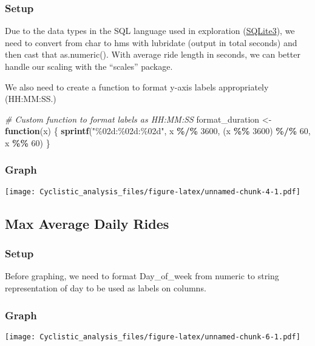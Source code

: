 \documentclass[
]{article}
\newenvironment{Shaded}{\begin{snugshade}}{\end{snugshade}}
\newcommand{\CommentTok}[1]{\textcolor[rgb]{0.56,0.35,0.01}{\textit{#1}}}
\newcommand{\ControlFlowTok}[1]{\textcolor[rgb]{0.13,0.29,0.53}{\textbf{#1}}}
\newcommand{\DecValTok}[1]{\textcolor[rgb]{0.00,0.00,0.81}{#1}}
\newcommand{\FunctionTok}[1]{\textcolor[rgb]{0.13,0.29,0.53}{\textbf{#1}}}
\newcommand{\NormalTok}[1]{#1}
\newcommand{\OtherTok}[1]{\textcolor[rgb]{0.56,0.35,0.01}{#1}}
\newcommand{\SpecialCharTok}[1]{\textcolor[rgb]{0.81,0.36,0.00}{\textbf{#1}}}
\newcommand{\StringTok}[1]{\textcolor[rgb]{0.31,0.60,0.02}{#1}}
\begin{document}
\subsubsection{Setup}\label{setup}

Due to the data types in the SQL language used in exploration
(\href{https://www.sqlite.org/datatype3.html}{SQLite3}), we need to
convert from char to hms with lubridate (output in total seconds) and
then cast that as.numeric(). With average ride length in seconds, we can
better handle our scaling with the ``scales'' package.

\begin{Shaded}
\end{Shaded}

We also need to create a function to format y-axis labels appropriately
(HH:MM:SS.)

\begin{Shaded}
\begin{Highlighting}[]
\CommentTok{\# Custom function to format labels as HH:MM:SS}
\NormalTok{format\_duration }\OtherTok{\textless{}{-}} \ControlFlowTok{function}\NormalTok{(x) \{}
  \FunctionTok{sprintf}\NormalTok{(}\StringTok{"\%02d:\%02d:\%02d"}\NormalTok{, x }\SpecialCharTok{\%/\%} \DecValTok{3600}\NormalTok{, (x }\SpecialCharTok{\%\%} \DecValTok{3600}\NormalTok{) }\SpecialCharTok{\%/\%} \DecValTok{60}\NormalTok{, x }\SpecialCharTok{\%\%} \DecValTok{60}\NormalTok{)}
\NormalTok{\}}
\end{Highlighting}
\end{Shaded}

\subsubsection{Graph}\label{graph}

\texttt{[image: Cyclistic\_analysis\_files/figure-latex/unnamed-chunk-4-1.pdf]}

\subsection{Max Average Daily Rides}\label{max-average-daily-rides}

\subsubsection{Setup}\label{setup-1}

Before graphing, we need to format Day\_of\_week from numeric to string
representation of day to be used as labels on columns.

\subsubsection{Graph}\label{graph-1}

\texttt{[image: Cyclistic\_analysis\_files/figure-latex/unnamed-chunk-6-1.pdf]}
\end{document}
